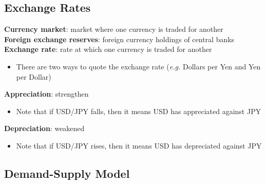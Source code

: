 \documentclass{article}
\newcommand{\eg}[0]{\textit{e.g. }}
\begin{document}
\begin{multicols}{2}
\section{Exchange Rates}
\textbf{Currency market}: market where one currency is traded for another\\
\textbf{Foreign exchange reserves}: foreign currency holdings of central banks\\
\textbf{Exchange rate}: rate at which one currency is traded for another
\begin{itemize}
	\item There are two ways to quote the exchange rate (\eg Dollars per Yen and Yen per Dollar)
\end{itemize}
\textbf{Appreciation}: strengthen
\begin{itemize}
	\item Note that if USD/JPY falls, then it means USD has appreciated against JPY
\end{itemize}
\textbf{Depreciation}: weakened
\begin{itemize}
	\item Note that if USD/JPY rises, then it means USD has depreciated against JPY
\end{itemize}
\subsection{Demand-Supply Model}

\end{multicols}
\end{document}

